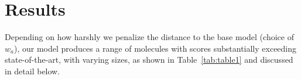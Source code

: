 \documentclass[11pt]{article}
\begin{document}




\section{Results}\label{sec:results}
Depending on how harshly we penalize the distance to the base model (choice of $w_a$), our model produces a range of molecules with scores substantially exceeding state-of-the-art, with varying sizes, as shown in Table~\ref{tab:table1} and discussed in detail below.
\end{document}

